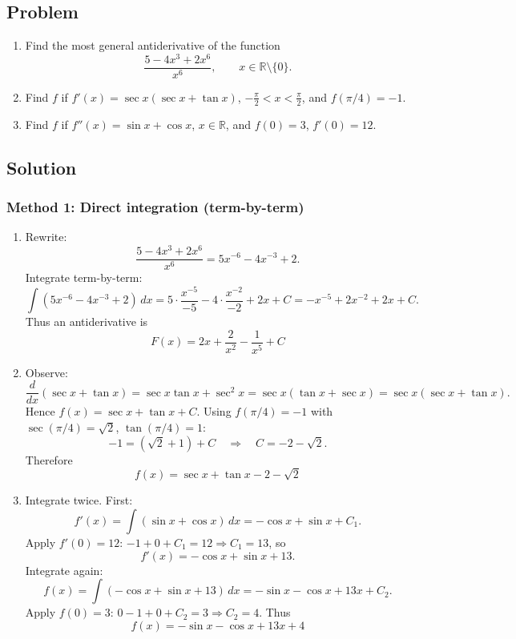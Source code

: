 \documentclass[12pt]{article}
\begin{document}
\subsection*{Problem}

\begin{enumerate}[label=(\roman*)]
\item Find the most general antiderivative of the function
\[
\frac{5 - 4x^3 + 2x^6}{x^6},
\qquad x\in\mathbb{R}\setminus\{0\}.
\]
\item Find \(f\) if \(f'(x)=\sec x(\sec x+\tan x)\), \(-\frac{\pi}{2}<x<\frac{\pi}{2}\), and \(f(\pi/4)=-1\).
\item Find \(f\) if \(f''(x)=\sin x+\cos x\), \(x\in\mathbb{R}\), and \(f(0)=3\), \(f'(0)=12\).
\end{enumerate}

\subsection*{Solution}

\subsubsection*{Method 1: Direct integration (term-by-term)}

\begin{enumerate}[label=(\roman*)]
\item Rewrite:
\[
\frac{5 - 4x^3 + 2x^6}{x^6} = 5x^{-6} - 4x^{-3} + 2.
\]
Integrate term-by-term:
\[
\int \left(5x^{-6} - 4x^{-3} + 2\right)\,dx
= 5\cdot \frac{x^{-5}}{-5} - 4\cdot \frac{x^{-2}}{-2} + 2x + C
= -x^{-5} + 2x^{-2} + 2x + C.
\]
Thus an antiderivative is
\[
\boxed{F(x)=2x+\frac{2}{x^2}-\frac{1}{x^5}+C}\]

\item Observe:
\[
\frac{d}{dx}(\sec x+\tan x)=\sec x\tan x+\sec^2 x=\sec x(\tan x+\sec x)=\sec x(\sec x+\tan x).
\]
Hence \(f(x)=\sec x+\tan x + C\). Using \(f(\pi/4)=-1\) with \(\sec(\pi/4)=\sqrt{2}\), \(\tan(\pi/4)=1\):
\[
-1 = (\sqrt{2}+1)+C \quad\Rightarrow\quad C=-2-\sqrt{2}.
\]
Therefore
\[
\boxed{f(x)=\sec x+\tan x -2-\sqrt{2}}
\]

\item Integrate twice. First:
\[
f'(x)=\int(\sin x+\cos x)\,dx=-\cos x+\sin x + C_1.
\]
Apply \(f'(0)=12\): \(-1+0+C_1=12\Rightarrow C_1=13\), so
\[
f'(x)=-\cos x+\sin x+13.
\]
Integrate again:
\[
f(x)=\int(-\cos x+\sin x+13)\,dx=-\sin x-\cos x+13x+C_2.
\]
Apply \(f(0)=3\): \(0-1+0+C_2=3\Rightarrow C_2=4\). Thus
\[
\boxed{f(x)=-\sin x-\cos x+13x+4}
\]
\end{enumerate}
\end{document}
